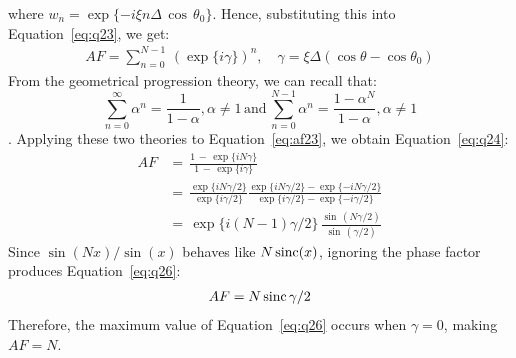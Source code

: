 {%
where $w_{n} = \exp \{-i\xi n\Delta \, \cos \, \theta_0 \}$. Hence, substituting this into  Equation~\ref{eq:q23}, we get:
%
\begin{equation}
  \begin{aligned}
   AF = \sum_{n = 0}^{N-1} \, (\exp \{i\gamma\})^n, \quad \gamma = \xi\Delta(\cos \theta - \cos \theta_{0})
  \end{aligned}
  \label{eq:af23}
 \end{equation} 
%
%
\noindent From the geometrical progression theory, we can recall that: 
$$ \sum_{n = 0}^{\infty}\alpha^n = \frac{1}{1 - \alpha}, \alpha \neq 1 \, \mathrm{and} \, \sum_{n = 0}^{N - 1}\alpha^n = \frac{1 - \alpha^N}{1 - \alpha}, \alpha \neq 1$$.
\noindent Applying these two theories to Equation~\ref{eq:af23}, we obtain Equation~\ref{eq:q24}:
\begin{subequations}\label{eq:q24}
 \begin{align}
   AF & =\, \frac{1 \, - \, \exp \{ iN\gamma\}}{1 \, - \, \exp \{ i\gamma\}}	\label{eq:q24a}\\ 
     & =\, \frac{\exp \{ iN\gamma/ 2\}}{\exp \{ i\gamma/ 2\}}\frac{\exp \{ iN\gamma/ 2\} - \exp \{ -iN\gamma/ 2\}}{\exp \{ i\gamma/ 2\}-\exp \{ -i\gamma/ 2\}}	\label{eq:q24b}\\ 
      & =\,  \exp \{ i(N - 1)\gamma / 2\}\,\frac{\sin \, (N\gamma/2)}{\sin \, (\gamma/2)} 	\label{eq:q24c}
 \end{align}  
 \end{subequations}
%
%
\noindent Since $\sin(Nx)/\sin(x)$ behaves like $N\operatorname{sinc}(x)$, ignoring the phase factor produces Equation~\ref{eq:q26}:
%
%
%
\begin{equation}
  \begin{aligned}
   AF = N\operatorname{sinc}  \gamma/2
  \end{aligned}
  \label{eq:q26}
 \end{equation} 
% 
\noindent Therefore, the maximum value of Equation~\ref{eq:q26} occurs when $\gamma = 0$, making $AF = N$. 
}  %

